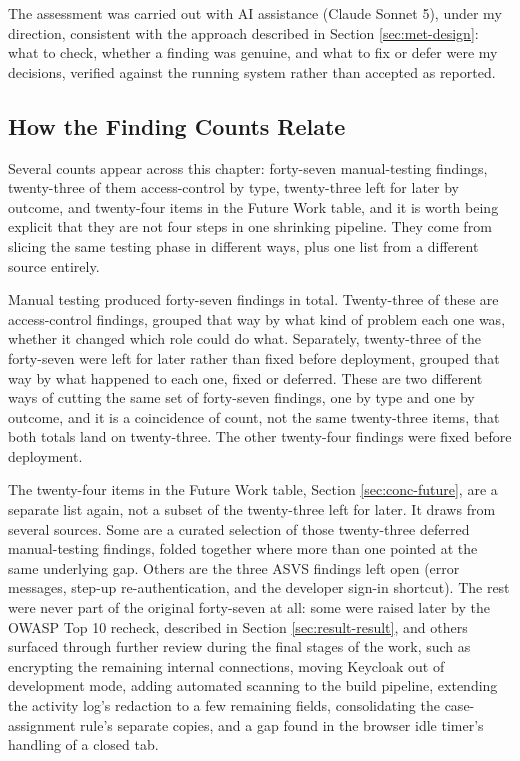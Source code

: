 The assessment was carried out with AI assistance (Claude Sonnet 5), under my direction, consistent with the approach described in Section \ref{sec:met-design}: what to check, whether a finding was genuine, and what to fix or defer were my decisions, verified against the running system rather than accepted as reported.

\subsection{How the Finding Counts Relate}

Several counts appear across this chapter: forty-seven manual-testing findings, twenty-three of them access-control by type, twenty-three left for later by outcome, and twenty-four items in the Future Work table, and it is worth being explicit that they are not four steps in one shrinking pipeline. They come from slicing the same testing phase in different ways, plus one list from a different source entirely.

Manual testing produced forty-seven findings in total. Twenty-three of these are access-control findings, grouped that way by what kind of problem each one was, whether it changed which role could do what. Separately, twenty-three of the forty-seven were left for later rather than fixed before deployment, grouped that way by what happened to each one, fixed or deferred. These are two different ways of cutting the same set of forty-seven findings, one by type and one by outcome, and it is a coincidence of count, not the same twenty-three items, that both totals land on twenty-three. The other twenty-four findings were fixed before deployment.

The twenty-four items in the Future Work table, Section \ref{sec:conc-future}, are a separate list again, not a subset of the twenty-three left for later. It draws from several sources. Some are a curated selection of those twenty-three deferred manual-testing findings, folded together where more than one pointed at the same underlying gap. Others are the three ASVS findings left open (error messages, step-up re-authentication, and the developer sign-in shortcut). The rest were never part of the original forty-seven at all: some were raised later by the OWASP Top 10 recheck, described in Section \ref{sec:result-result}, and others surfaced through further review during the final stages of the work, such as encrypting the remaining internal connections, moving Keycloak out of development mode, adding automated scanning to the build pipeline, extending the activity log's redaction to a few remaining fields, consolidating the case-assignment rule's separate copies, and a gap found in the browser idle timer's handling of a closed tab.

